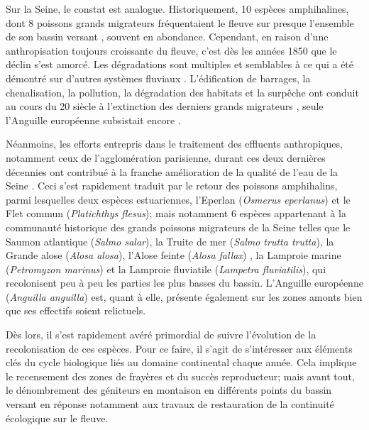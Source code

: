 \documentclass[11pt,titlepage,twoside]{article}\usepackage[]{graphicx}\usepackage[table]{xcolor}
\begin{document}
Sur la Seine, le constat est analogue. Historiquement, 10 espèces amphihalines, dont 8 poissons grands migrateurs
fréquentaient le fleuve sur presque l'ensemble de son bassin versant \citep{moreau_histoire_1881,moreau_les_1898,
poplin_peuplement_1952,euzenat_migren_1992,rochard_identification_2007}, souvent en abondance. Cependant,
en raison d'une anthropisation toujours croissante du fleuve, c'est dès les années 1850 que le déclin s'est amorcé.
Les dégradations sont multiples et semblables à ce qui a été démontré sur d'autres systèmes fluviaux
\citep{nehlsen_pacific_2011,mcdowall_different_1999,lichatowich_depletion_1999,mckinnell_spatial_1999,
limburg_dramatic_2009}. L'édification de barrages, la chenalisation, la pollution, la dégradation des habitats et la surpêche ont conduit au cours du 20 siècle à l'extinction des derniers grands migrateurs
\citep{euzenat_migren_1992,belliard_peuplement_1994,mouchel_bassin_1998,boet_multiple_1999,rochard_identification_2007},
seule l'Anguille européenne subsistait encore \citep{boet_multiple_1999,rochard_identification_2007}.

Néanmoins, les efforts entrepris dans le traitement des effluents anthropiques, notamment ceux de l'agglomération parisienne, durant ces deux dernières décennies ont contribué à la franche amélioration de la qualité de l'eau de la Seine \citep{billen_programme_1999,belliard_return_2009,
gousailles_limpact_2009}. Ceci s'est rapidement traduit par le retour des poissons amphihalins, parmi lesquelles deux espèces estuariennes, l'Eperlan (\textit{Osmerus eperlanus}) \citep{pomfret_spatial_1991} et le Flet commun
(\textit{Platichthys flesus}); mais notamment 6 espèces appartenant à la communauté historique des grands poissons
migrateurs de la Seine \citep{rochard_identification_2009} telles que le Saumon atlantique (\textit{Salmo salar}),
la Truite de mer (\textit{Salmo trutta trutta}), la Grande alose (\textit{Alosa alosa}), l'Alose feinte
(\textit{Alosa fallax}) \citep{duhamel_peuplement_2004}, la Lamproie marine (\textit{Petromyzon marinus}) et la
Lamproie fluviatile (\textit{Lampetra fluviatilis}), qui recolonisent peu à peu les parties les plus basses du bassin. L'Anguille européenne (\textit{Anguilla anguilla}) est, quant à elle, présente également sur les zones amonts bien que ses effectifs soient relictuels.

Dès lors, il s'est rapidement avéré primordial de suivre l'évolution de la recolonisation de ces espèces. Pour ce faire, il s'agit de s'intéresser aux éléments clés du cycle biologique liés au domaine continental chaque année. Cela implique
le recensement des zones de frayères et du succès reproducteur; mais avant tout, le dénombrement des géniteurs en montaison en différents points du bassin versant en réponse notamment aux travaux de restauration de la continuité écologique sur le fleuve.
\end{document}
